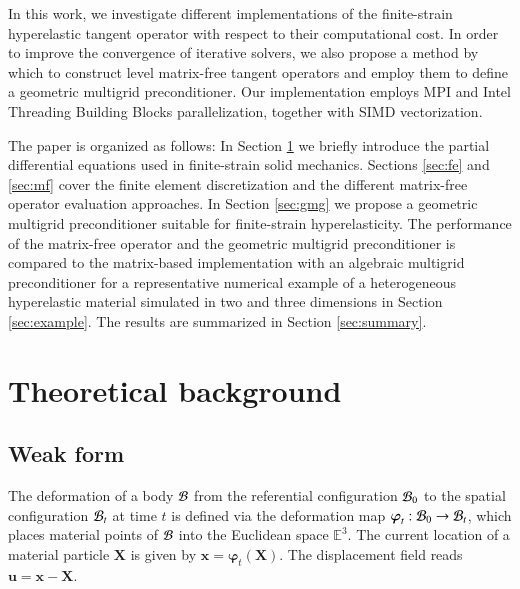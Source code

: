 \documentclass[preprint,12pt,times]{elsarticle}
\def\gz  #1{           \mbox{$\boldsymbol{#1}$}}
\def\mcl  #1{               {\cal #1}}
\begin{document}
In this work, we investigate different implementations of the finite-strain hyperelastic tangent operator with respect to their computational cost.
In order to improve the convergence of iterative solvers, we also propose a method by which to construct level matrix-free tangent operators
and employ them to define a \mbox{geometric} multigrid preconditioner.
Our implementation employs MPI and Intel Threading Building Blocks parallelization, together with SIMD vectorization.

The paper is organized as follows: In Section \ref{sec:theory} we briefly introduce the partial differential equations used in  finite-strain solid mechanics. Sections \ref{sec:fe} and \ref{sec:mf} cover the finite element discretization and the different matrix-free operator evaluation approaches. In Section \ref{sec:gmg} we propose a geometric multigrid preconditioner suitable for finite-strain hyperelasticity. The performance of the matrix-free operator and the geometric multigrid preconditioner is compared to the matrix-based implementation with an algebraic multigrid preconditioner for a representative numerical example of a heterogeneous hyperelastic material simulated in two and three dimensions in Section \ref{sec:example}. The results are summarized in Section \ref{sec:summary}.

\section{Theoretical background}
\label{sec:theory}

\subsection{Weak form}
%
%
The deformation of a body $\mcl B$ from the {\color{red}referential} configuration $\mcl B_0$ to the {\color{red}spatial} configuration $\mcl B_t$ at time $t$
is defined via the deformation map $\gz \varphi_t: \mcl B_0 \rightarrow \mcl B_t$, which places material points of $\mcl B$ into the Euclidean space $\mathbb E^3$.
The current location of a material particle $\gz X$ is given by $\gz x = \gz \varphi_t (\gz X)$.
The displacement field reads $\gz u = \gz x - \gz X$.
\end{document}
